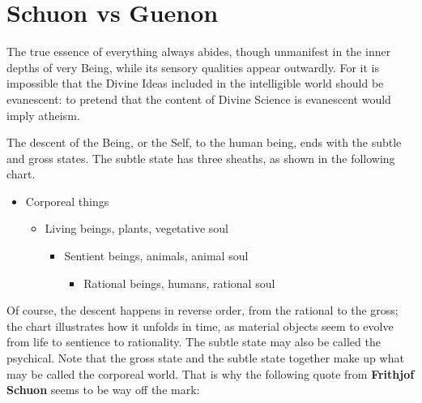 \section{Schuon vs Guenon}

\begin{quotex}
The true essence of everything always abides, though unmanifest in the inner depths of very Being, while its sensory qualities appear outwardly. For it is impossible that the Divine Ideas included in the intelligible world should be evanescent: to pretend that the content of Divine Science is evanescent would imply atheism.
\end{quotex}


The descent of the Being, or the Self, to the human being, ends with the subtle and gross states. The subtle state has three sheaths, as shown in the following chart.

\begin{itemize}


\item Corporeal things

  \begin{itemize}

  
\item Living beings, plants, vegetative soul

    \begin{itemize}

    
\item Sentient beings, animals, animal soul

      \begin{itemize}

      
\item Rational beings, humans, rational soul
      \end{itemize}

    \end{itemize}

  \end{itemize}

\end{itemize}


Of course, the descent happens in reverse order, from the rational to the gross; the chart illustrates how it unfolds in time, as material objects seem to evolve from life to sentience to rationality. The subtle state may also be called the psychical. Note that the gross state and the subtle state together make up what may be called the corporeal world. That is why the following quote from \textbf{Frithjof Schuon} seems to be way off the mark:

